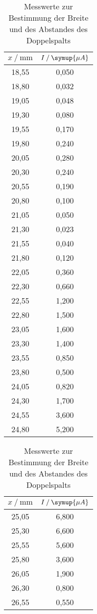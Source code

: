 \begin{table}[H]
   \centering
   \caption{Messwerte zur Bestimmung der Breite und des Abstandes des Doppelspalts}
   \label{tab:1dop}
   \begin{tabular}[t]{ c c }
 \toprule
 {$x\:/\: \mathrm{mm}$} & {$I\:/\: \symup{\mu A}$} \\
    \midrule
    18,55 & 0,050 \\
    18,80 & 0,032 \\
    19,05 & 0,048 \\
    19,30 & 0,080 \\
    19,55 & 0,170 \\
    19,80 & 0,240 \\
    20,05 & 0,280 \\
    20,30 & 0,240 \\
    20,55 & 0,190 \\
    20,80 & 0,100 \\
    21,05 & 0,050 \\
    21,30 & 0,023 \\
    21,55 & 0,040 \\
    21,80 & 0,120 \\
    22,05 & 0,360 \\
    22,30 & 0,660 \\
    22,55 & 1,200 \\
    22,80 & 1,500 \\
    23,05 & 1,600 \\
    23,30 & 1,400 \\
    23,55 & 0,850 \\
    23,80 & 0,500 \\
    24,05 & 0,820 \\
    24,30 & 1,700 \\
    24,55 & 3,600 \\
    24,80 & 5,200 \\
    \bottomrule
  \end{tabular}
  \qquad
  \begin{tabular}[t]{ c c }
    \toprule
    {$x\:/\: \mathrm{mm}$} & {$I\:/\: \symup{\mu A}$} \\
    \midrule
    25,05 & 6,800 \\
    25,30 & 6,600 \\
    25,55 & 5,600 \\
    25,80 & 3,600 \\
    26,05 & 1,900 \\
    26,30 & 0,800 \\
    26,55 & 0,550 \\

\end{tabular}
\end{table}
